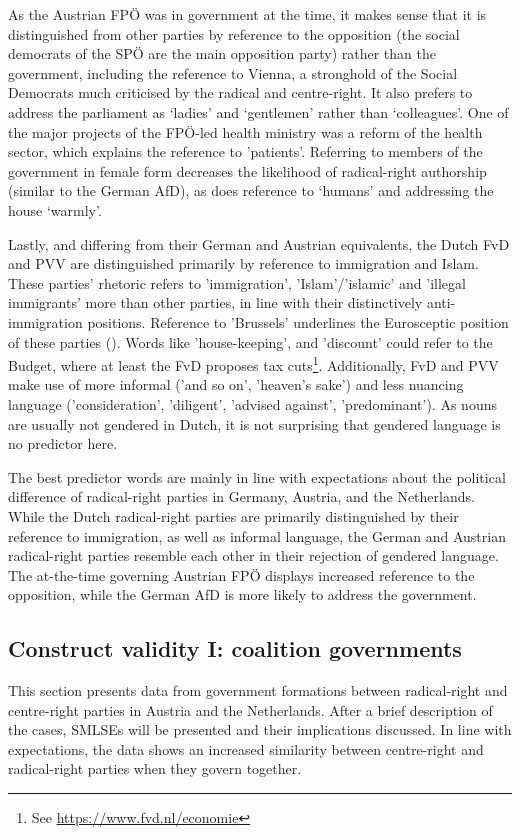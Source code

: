 \documentclass{article}
\begin{document}
As the Austrian FPÖ was in government at the time, it makes sense that it is distinguished from other parties by reference to the opposition (the social democrats of the SPÖ are the main opposition party) rather than the government, including the reference to Vienna, a stronghold of the Social Democrats much criticised by the radical and centre-right. It also prefers to address the parliament as ‘ladies’ and ‘gentlemen’ rather than ‘colleagues’. One of the major projects of the FPÖ-led health ministry was a reform of the health sector, which explains the reference to 'patients'. Referring to members of the government in female form decreases the likelihood of radical-right authorship (similar to the German AfD), as does reference to ‘humans’ and addressing the house ‘warmly’.\par

Lastly, and differing from their German and Austrian equivalents, the Dutch FvD and PVV are distinguished primarily by reference to immigration and Islam. These parties' rhetoric refers to 'immigration', 'Islam'/'islamic' and 'illegal immigrants' more than other parties, in line with their distinctively anti-immigration positions. Reference to 'Brussels' underlines the Eurosceptic position of these parties (\cite{ThePopulist2019}). Words like 'house-keeping', and 'discount' could refer to the Budget, where at least the FvD proposes tax cuts\footnote{See \url{https://www.fvd.nl/economie}}. Additionally, FvD and PVV make use of more informal ('and so on', 'heaven’s sake') and less nuancing language ('consideration', 'diligent', 'advised against', 'predominant'). As nouns are usually not gendered in Dutch, it is not surprising that gendered language is no predictor here.\par

The best predictor words are mainly in line with expectations about the political difference of radical-right parties in Germany, Austria, and the Netherlands. While the Dutch radical-right parties are primarily distinguished by their reference to immigration, as well as informal language, the German and Austrian radical-right parties resemble each other in their rejection of gendered language. The at-the-time governing Austrian FPÖ displays increased reference to the opposition, while the German AfD is more likely to address the government.\par


\subsection{Construct validity I: coalition governments}
This section presents data from government formations between radical-right and centre-right parties in Austria and the Netherlands. After a brief description of the cases, SMLSEs will be presented and their implications discussed. In line with expectations, the data shows an increased similarity between centre-right and radical-right parties when they govern together. \par
\end{document}
